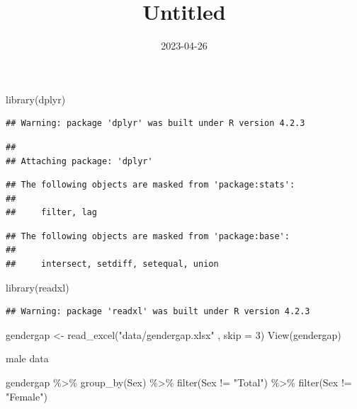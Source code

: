 \documentclass[
]{article}
\title{Untitled}
\author{}
\date{\vspace{-2.5em}2023-04-26}
\newenvironment{Shaded}{\begin{snugshade}}{\end{snugshade}}
\newcommand{\AttributeTok}[1]{\textcolor[rgb]{0.77,0.63,0.00}{#1}}
\newcommand{\DecValTok}[1]{\textcolor[rgb]{0.00,0.00,0.81}{#1}}
\newcommand{\FunctionTok}[1]{\textcolor[rgb]{0.00,0.00,0.00}{#1}}
\newcommand{\NormalTok}[1]{#1}
\newcommand{\OtherTok}[1]{\textcolor[rgb]{0.56,0.35,0.01}{#1}}
\newcommand{\SpecialCharTok}[1]{\textcolor[rgb]{0.00,0.00,0.00}{#1}}
\newcommand{\StringTok}[1]{\textcolor[rgb]{0.31,0.60,0.02}{#1}}
\begin{document}
\maketitle

\begin{Shaded}
\begin{Highlighting}[]
\FunctionTok{library}\NormalTok{(dplyr)}
\end{Highlighting}
\end{Shaded}

\begin{verbatim}
## Warning: package 'dplyr' was built under R version 4.2.3
\end{verbatim}

\begin{verbatim}
## 
## Attaching package: 'dplyr'
\end{verbatim}

\begin{verbatim}
## The following objects are masked from 'package:stats':
## 
##     filter, lag
\end{verbatim}

\begin{verbatim}
## The following objects are masked from 'package:base':
## 
##     intersect, setdiff, setequal, union
\end{verbatim}

\begin{Shaded}
\begin{Highlighting}[]
\FunctionTok{library}\NormalTok{(readxl)}
\end{Highlighting}
\end{Shaded}

\begin{verbatim}
## Warning: package 'readxl' was built under R version 4.2.3
\end{verbatim}

\begin{Shaded}
\begin{Highlighting}[]
\NormalTok{gendergap }\OtherTok{\textless{}{-}} \FunctionTok{read\_excel}\NormalTok{(}\StringTok{"data/gendergap.xlsx"}\NormalTok{ , }\AttributeTok{skip =} \DecValTok{3}\NormalTok{)}
\FunctionTok{View}\NormalTok{(gendergap)}
\end{Highlighting}
\end{Shaded}

male data

\begin{Shaded}
\begin{Highlighting}[]
\NormalTok{gendergap }\SpecialCharTok{\%\textgreater{}\%}
\FunctionTok{group\_by}\NormalTok{(Sex) }\SpecialCharTok{\%\textgreater{}\%}
  \FunctionTok{filter}\NormalTok{(Sex }\SpecialCharTok{!=} \StringTok{"Total"}\NormalTok{) }\SpecialCharTok{\%\textgreater{}\%}
\FunctionTok{filter}\NormalTok{(Sex }\SpecialCharTok{!=} \StringTok{"Female"}\NormalTok{)}
\end{Highlighting}
\end{Shaded}
\end{document}
